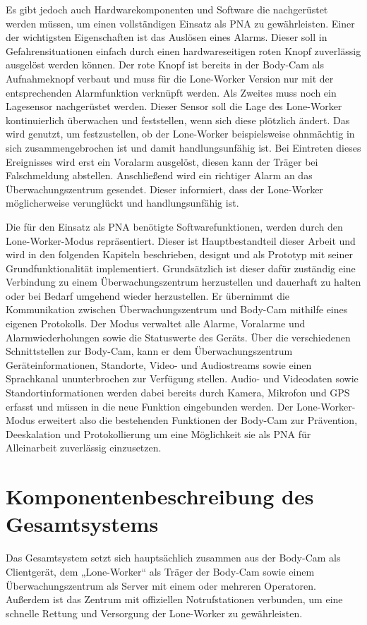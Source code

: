 \documentclass[thesis.tex]{subfiles}
\begin{document}
Es gibt jedoch auch Hardwarekomponenten und Software die nachgerüstet werden müssen, um einen vollständigen Einsatz als PNA zu gewährleisten.
Einer der wichtigsten Eigenschaften ist das Auslösen eines Alarms.
Dieser soll in Gefahrensituationen einfach durch einen hardwareseitigen roten Knopf zuverlässig ausgelöst werden können.
Der rote Knopf ist bereits in der Body-Cam als Aufnahmeknopf verbaut und muss für die Lone-Worker Version nur mit der entsprechenden Alarmfunktion verknüpft werden.
Als Zweites muss noch ein Lagesensor nachgerüstet werden.
Dieser Sensor soll die Lage des Lone-Worker kontinuierlich überwachen und feststellen, wenn sich diese plötzlich ändert.
Das wird genutzt, um festzustellen, ob der Lone-Worker beispielsweise ohnmächtig in sich zusammengebrochen ist und damit handlungsunfähig ist.
Bei Eintreten dieses Ereignisses wird erst ein Voralarm ausgelöst, diesen kann der Träger bei Falschmeldung abstellen.
Anschließend wird ein richtiger Alarm an das Überwachungszentrum gesendet.
Dieser informiert, dass der Lone-Worker möglicherweise verunglückt und handlungsunfähig ist.

Die für den Einsatz als PNA benötigte Softwarefunktionen, werden durch den Lone-Worker-Modus repräsentiert.
Dieser ist Hauptbestandteil dieser Arbeit und wird in den folgenden Kapiteln beschrieben, designt und als Prototyp mit seiner Grundfunktionalität implementiert.
Grundsätzlich ist dieser dafür zuständig eine Verbindung zu einem Überwachungszentrum herzustellen und dauerhaft zu halten oder bei Bedarf umgehend wieder herzustellen.
Er übernimmt die Kommunikation zwischen Überwachungszentrum und Body-Cam mithilfe eines eigenen Protokolls.
Der Modus verwaltet alle Alarme, Voralarme und Alarmwiederholungen sowie die Statuswerte des Geräts.
Über die verschiedenen Schnittstellen zur Body-Cam, kann er dem Überwachungszentrum Geräteinformationen, Standorte, Video- und Audiostreams sowie einen Sprachkanal ununterbrochen zur Verfügung stellen.
Audio- und Videodaten sowie Standortinformationen werden dabei bereits durch Kamera, Mikrofon und GPS erfasst und müssen in die neue Funktion eingebunden werden.
Der Lone-Worker-Modus erweitert also die bestehenden Funktionen der Body-Cam zur Prävention, Deeskalation und Protokollierung um eine Möglichkeit sie als PNA für Alleinarbeit zuverlässig einzusetzen.

\section{Komponentenbeschreibung des Gesamtsystems}
Das Gesamtsystem setzt sich hauptsächlich zusammen aus der Body-Cam als Clientgerät, dem „Lone-Worker“
als Träger der Body-Cam sowie einem Überwachungszentrum als Server mit einem oder mehreren Operatoren.
Außerdem ist das Zentrum mit offiziellen Notrufstationen verbunden, um eine schnelle Rettung und Versorgung der Lone-Worker zu gewährleisten.
\end{document}
